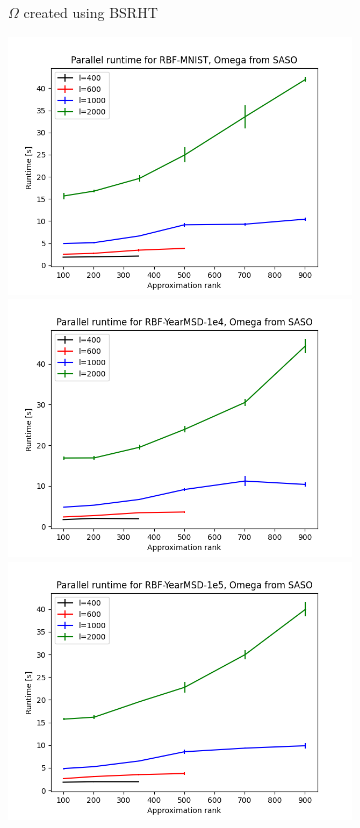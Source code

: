 \documentclass{article}
\theoremstyle{definition}
\begin{document}
\begin{figure}
\begin{subfigure}[t]{\textwidth+20pt\relax}
    \caption{$\Omega$ created using BSRHT}
\end{subfigure}\hfill
\begin{subfigure}[t]{0.4\textwidth}
    \includegraphics[width=\textwidth]{plots/runtime/runtime_par_RBF-MNIST_SASO.png}
    \includegraphics[width=\textwidth]{plots/runtime/runtime_par_RBF-YearMSD-1e4_SASO.png}
    \includegraphics[width=\textwidth]{plots/runtime/runtime_par_RBF-YearMSD-1e5_SASO.png}

\end{subfigure}
\end{figure}
\end{document}
